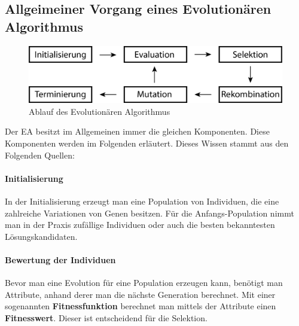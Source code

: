 \subsection{Allgeimeiner Vorgang eines Evolution{\"a}ren Algorithmus}
\begin{figure}
	\centering
    \includegraphics[width=\textwidth]{pics/algoSchritte.png}
    \caption{Ablauf des Evolution{\"a}ren Algorithmus}
    \label{fig:algoSchritte}
\end{figure}
Der EA besitzt im Allgemeinen immer die gleichen Komponenten. Diese Komponenten werden im Folgenden erl{\"a}utert. Dieses Wissen stammt aus den Folgenden Quellen: \cite{shiffman2012nature, flickevolutionare, weicker2015evolutionare}

\paragraph*{Initialisierung}
In der Initialisierung erzeugt man eine Population von Individuen, die eine zahlreiche Variationen von Genen besitzen. F{\"u}r die Anfangs-Population nimmt man in der Praxis zuf{\"a}llige Individuen oder auch die besten bekanntesten L{\"o}sungskandidaten.

\paragraph*{Bewertung der Individuen}
Bevor man eine Evolution f{\"u}r eine Population erzeugen kann, ben{\"o}tigt man Attribute, anhand derer man die n{\"a}chste Generation berechnet. 
Mit einer sogenannten \textbf{Fitnessfunktion} berechnet man mittels der Attribute einen \textbf{Fitnesswert}. Dieser ist entscheidend f{\"u}r die Selektion.



